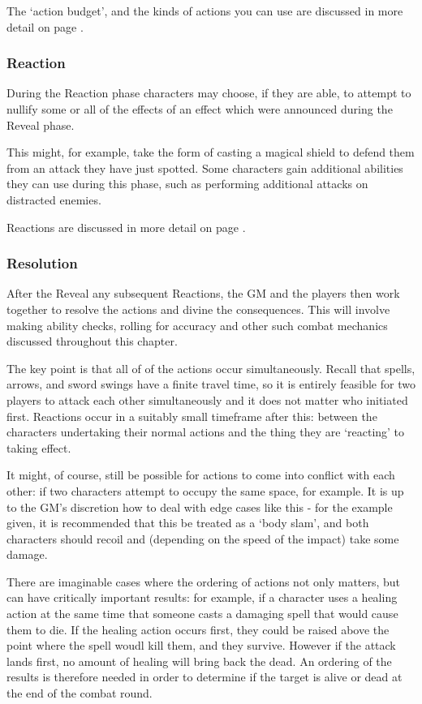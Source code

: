 The `action budget', and the kinds of actions you can use are discussed in more detail on page \pageref{S:CombatActions}. 

\subsubsection{Reaction}

During the Reaction phase characters may choose, if they are able, to attempt to nullify some or all of the effects of an effect which were announced during the Reveal phase.

This might, for example, take the form of casting a magical shield to defend them from an attack they have just spotted. Some characters gain additional abilities they can use during this phase, such as performing additional attacks on distracted enemies.

Reactions are discussed in more detail on page \pageref{S:Reactions}. 

\subsubsection{Resolution}

After the Reveal any subsequent Reactions, the GM and the players then work together to resolve the actions and divine the consequences. This will involve making ability checks, rolling for accuracy and other such combat mechanics discussed throughout this chapter. 

The key point is that all of of the actions occur simultaneously. Recall that spells, arrows, and sword swings have a finite travel time, so it is entirely feasible for two players to attack each other simultaneously and it does not matter who initiated first. Reactions occur in a suitably small timeframe after this: between the characters undertaking their normal actions and the thing they are `reacting' to taking effect.

It might, of course, still be possible for actions to come into conflict with each other: if two characters attempt to occupy the same space, for example. It is up to the GM's discretion how to deal with edge cases like this - for the example given, it is recommended that this be treated as a `body slam', and both characters should recoil and (depending on the speed of the impact) take some damage. 

There are imaginable cases where the ordering of actions not only matters, but can have critically important results: for example, if a character uses a healing action at the same time that someone casts a damaging spell that would cause them to die. If the healing action occurs first, they could be raised above the point where the spell woudl kill them, and they survive. However if the attack lands first, no amount of healing will bring back the dead. An ordering of the results is therefore needed in order to determine if the target is alive or dead at the end of the combat round. 

